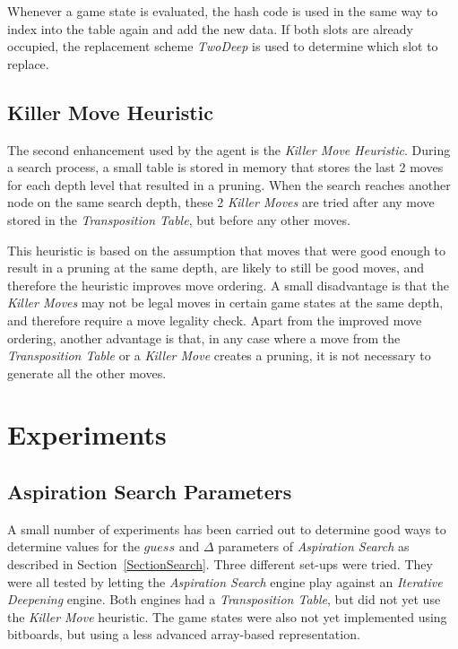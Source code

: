 \documentclass{article}
\newcommand{\refsection}[1]{Section~\ref{#1}}
\begin{document}
Whenever a game state is evaluated, the hash code is used in the same way to index into the table again and add the new data. If both slots are already occupied, the replacement scheme \emph{TwoDeep} \cite{ReplacementSchemes1994} is used to determine which slot to replace.

\subsection{Killer Move Heuristic}
The second enhancement used by the agent is the \emph{Killer Move Heuristic}. During a search process, a small table is stored in memory that stores the last 2 moves for each depth level that resulted in a pruning. When the search reaches another node on the same search depth, these 2 \emph{Killer Moves} are tried after any move stored in the \emph{Transposition Table}, but before any other moves. 

This heuristic is based on the assumption that moves that were good enough to result in a pruning at the same depth, are likely to still be good moves, and therefore the heuristic improves move ordering. A small disadvantage is that the \emph{Killer Moves} may not be legal moves in certain game states at the same depth, and therefore require a move legality check. Apart from the improved move ordering, another advantage is that, in any case where a move from the \emph{Transposition Table} or a \emph{Killer Move} creates a pruning, it is not necessary to generate all the other moves.

\section{Experiments} \label{SectionExperiments}

\subsection{Aspiration Search Parameters}
A small number of experiments has been carried out to determine good ways to determine values for the $guess$ and $\Delta$ parameters of \emph{Aspiration Search} as described in \refsection{SectionSearch}. Three different set-ups were tried. They were all tested by letting the \emph{Aspiration Search} engine play against an \emph{Iterative Deepening} engine. Both engines had a \emph{Transposition Table}, but did not yet use the \emph{Killer Move} heuristic. The game states were also not yet implemented using bitboards, but using a less advanced array-based representation.
\end{document}
